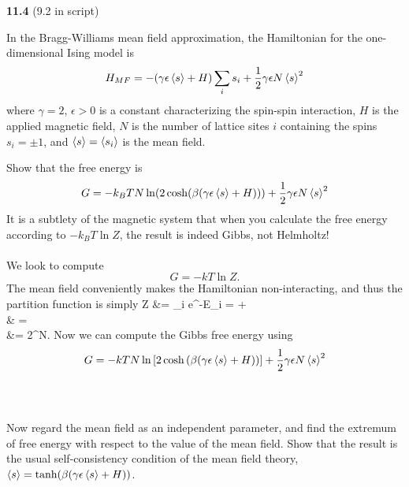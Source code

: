 \documentclass[11pt,letterpaper]{article}
\begin{document}
	
	\item[\textbf{11.4}]
	(9.2 in script)
	
	In the Bragg-Williams mean field approximation, the Hamiltonian for the one-dimensional Ising
	model is
	\[
		H_{MF} = -(\gamma \epsilon\braket s +H)\sum_i s_i +\frac{1}{2}\gamma\epsilon N\braket s^2
	\]
	where $\gamma = 2$, $\epsilon >0$ is a constant characterizing the spin-spin interaction, $H$ is the
	applied magnetic field, $N$ is the number of lattice sites $i$ containing the spins $s_i = \pm 1$, and
	$\braket s = \braket{s_i}$ is the mean field. 
	
	\benum
		\item
		Show that the free energy is
		\[
			G = -k_B TN\ln(2\cosh(\beta(\gamma\epsilon \braket s +H))) +\frac{1}{2}\gamma
			\epsilon N\braket{s}^2
		\]
		It is a subtlety of the magnetic system that when you calculate the free energy according to
		$-k_BT\ln Z$, the result is indeed Gibbs, not Helmholtz!
		\\ \\
		We look to compute
		\[
			G = -kT\ln Z.
		\]
		The mean field conveniently makes the Hamiltonian non-interacting, and thus the
		partition function is simply
		\ba
			Z &= \sum_i e^{-\beta E_i} =
			\exp{}+
			\exp{} \\
			& = \exp{}
			\\ &=\exp{}
			2\cosh{}^N.
		\ea
		Now we can compute the Gibbs free energy using 
		\[
			G = -kTN\ln\left[2\cosh\left(\beta(\gamma \epsilon \braket s +H)\right)\right]
			+\frac{1}{2}\gamma\epsilon N\braket{s}^2
		\]
		\\ \\
		\item
		Now regard the mean field as an independent parameter, and find the extremum of free energy
		with respect to the value of the mean field. Show that the result is the usual self-consistency condition 
		of the mean field theory, $\braket s = \tanh(\beta(\gamma\epsilon \braket s +H))$.
		\\ \\
\end{document}
